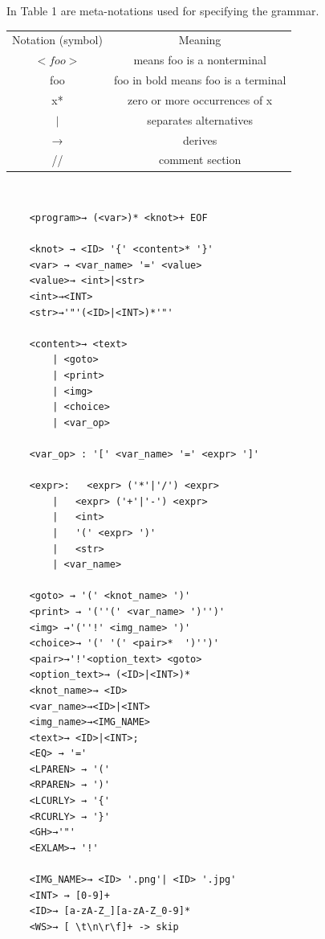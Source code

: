\noindent In Table 1 are meta-notations used for specifying the grammar. 
\begin{table}[h]
    \centering
    \begin{tabular}{|c|c|}
        \hline
        Notation (symbol) & Meaning\\
        \cline{1-2}
        $<foo>$ & means foo is a nonterminal\\
        \hline
        foo & foo in bold means foo is a terminal\\
        \hline
        x* & zero or more occurrences of x\\
        \hline
        $|$ & separates alternatives\\
        \hline
        → & derives\\
        \hline
        // & comment section\\
        \hline
    \end{tabular}
    \label{tbl:epochs}
\end{table} \\
\begin{verbatim}
    <program>→ (<var>)* <knot>+ EOF
    
    <knot> → <ID> '{' <content>* '}' 
    <var> → <var_name> '=' <value>
    <value>→ <int>|<str>
    <int>→<INT>
    <str>→'"'(<ID>|<INT>)*'"'
    
    <content>→ <text>
    	| <goto>
    	| <print>
    	| <img>
    	| <choice>
    	| <var_op>
    
    <var_op> : '[' <var_name> '=' <expr> ']'
    
    <expr>:   <expr> ('*'|'/') <expr>
    	|   <expr> ('+'|'-') <expr>
    	|   <int>
    	|   '(' <expr> ')'
    	|   <str>
    	| <var_name>
    
    <goto> → '(' <knot_name> ')' 
    <print> → '(''(' <var_name> ')'')'
    <img> →'(''!' <img_name> ')'
    <choice>→ '(' '(' <pair>*  ')'')'
    <pair>→'!'<option_text> <goto>
    <option_text>→ (<ID>|<INT>)*
    <knot_name>→ <ID>
    <var_name>→<ID>|<INT>
    <img_name>→<IMG_NAME>
    <text>→ <ID>|<INT>;
    <EQ> → '=' 
    <LPAREN> → '(' 
    <RPAREN> → ')' 
    <LCURLY> → '{' 
    <RCURLY> → '}' 
    <GH>→'"'
    <EXLAM>→ '!'
    
    <IMG_NAME>→ <ID> '.png'| <ID> '.jpg'
    <INT> → [0-9]+ 
    <ID>→ [a-zA-Z_][a-zA-Z_0-9]* 
    <WS>→ [ \t\n\r\f]+ -> skip 
\end{verbatim}



